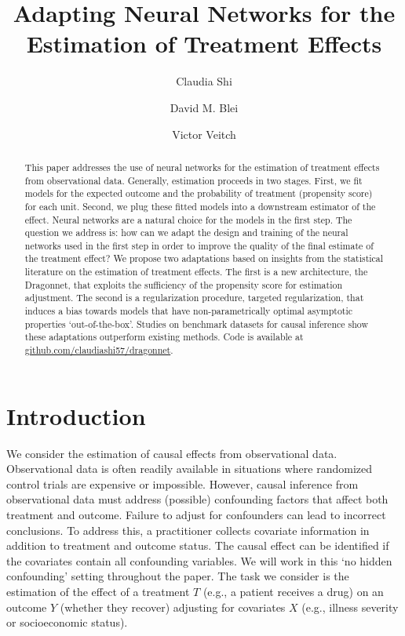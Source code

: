 \documentclass{article}
\title{Adapting Neural Networks for the Estimation of Treatment Effects}
\date{}
\author[1]{Claudia Shi}
\author[1,2]{David M. Blei}
\author[2]{Victor Veitch}
\affil[1]{Department of Computer Science, Columbia University}
\affil[2]{Department of Statistics, Columbia University}
\begin{document}
\maketitle

\begin{abstract}
This paper addresses the use of neural networks for the estimation of treatment effects from observational data.
Generally, estimation proceeds in two stages.
First, we fit models for the expected outcome and the probability of treatment (propensity score) for each unit.
Second, we plug these fitted models into a downstream estimator of the effect.
Neural networks are a natural choice for the models in the first step.
The question we address is: how can we adapt the design and training of the neural networks used in the first step in order to
improve the quality of the final estimate of the treatment effect?
We propose two adaptations based on insights from the statistical literature on the estimation of treatment effects.
The first is a new architecture, the Dragonnet, that exploits the sufficiency of the propensity score for estimation adjustment.
The second is a regularization procedure, targeted regularization, that induces a bias towards models 
that have non-parametrically optimal asymptotic properties `out-of-the-box'.
Studies on benchmark datasets for causal inference show these adaptations outperform existing methods. Code is available at \href{https://github.com/claudiashi57/dragonnet}{github.com/claudiashi57/dragonnet}.
\end{abstract}

\section{Introduction}
We consider the estimation of causal effects from observational data.
Observational data is often readily available in situations where randomized control trials
are expensive or impossible.
However, causal inference from observational data must address (possible) confounding factors that
affect both treatment and outcome.
Failure to adjust for confounders can lead to incorrect conclusions.
To address this, a practitioner collects covariate information in addition to treatment and outcome status.
The causal effect can be identified if the covariates contain all confounding variables.
We will work in this `no hidden confounding' setting throughout the paper.
The task we consider is the estimation of the effect of a treatment $T$ (e.g., a patient receives a drug)
on an outcome $Y$ (whether they recover) adjusting for covariates $X$ (e.g., illness severity or socioeconomic status).
\end{document}

